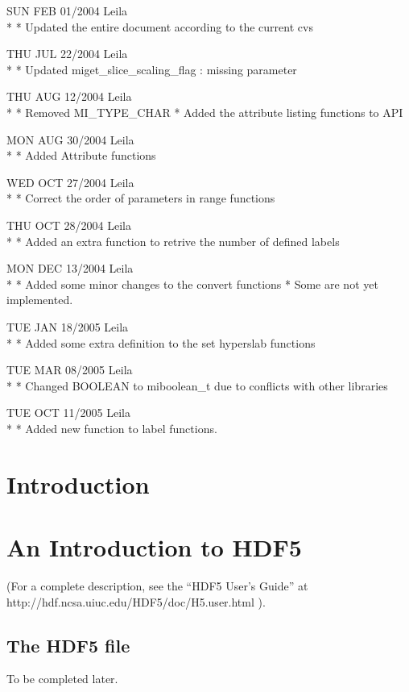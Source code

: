 \documentclass{article}
\begin{document}
SUN FEB 01/2004 Leila\\*
* Updated the entire document according to the current cvs

THU JUL 22/2004 Leila\\*
* Updated miget\_slice\_scaling\_flag : missing parameter

THU AUG 12/2004 Leila\\*
* Removed MI\_TYPE\_CHAR 
* Added the attribute listing functions to API

MON AUG 30/2004 Leila\\*
* Added Attribute functions

WED OCT 27/2004 Leila\\*
* Correct the order of parameters in range functions

THU OCT 28/2004 Leila\\*
* Added an extra function to retrive the number of defined labels

MON DEC 13/2004 Leila\\*
* Added some minor changes to the convert functions
* Some are not yet implemented. 

TUE JAN 18/2005 Leila\\*
* Added some extra definition to the set hyperslab functions

TUE MAR 08/2005 Leila\\*
* Changed BOOLEAN to miboolean_t due to conflicts with other libraries

TUE OCT 11/2005 Leila\\*
* Added new function to label  functions.

\section{Introduction}



\section{An Introduction to HDF5}

(For a complete description, see the ``HDF5 User's Guide''
at http://hdf.ncsa.uiuc.edu/HDF5/doc/H5.user.html ).

\subsection{The HDF5 file}

To be completed later. 
\end{document}
